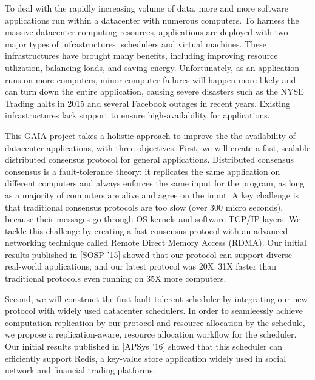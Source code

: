 {}

To deal with the rapidly increasing volume of data, more and more software
applications run within a datacenter with numerous computers. To harness the 
massive datacenter computing resources, applications are deployed with two 
major 
types of infrastructures: schedulers and virtual machines. These 
infrastructures have brought many benefits, including improving resource 
utlization, balancing loads, and saving energy. Unfortunately, as an 
application 
runs on more computers, minor computer failures will happen more likely and can 
turn down the entire application, causing severe disasters such as the NYSE 
Trading halts in 2015 and several Facebook outages in recent years. Existing 
infrastructures lack support to ensure high-availability for applications.

This GAIA project takes a holistic approach to improve the the availability of 
datacenter applications, with three objectives. First, we will create a fast, 
scalable distributed consensus protocol for general applications. Distributed 
consensus consensus is a fault-tolerance theory: it replicates the same 
application on different computers and always enforces the same input for the 
program, as long as a majority of computers are alive and agree on the input. A 
key challenge is that traditional consensus protocols are too slow (over 300 
micro seconds), because their messages go through OS kernels and software 
TCP/IP layers. We tackle this challenge by creating a fast consensus protocol 
with an advanced networking technique called Remote Direct Memory Access 
(RDMA). Our initial results published in [SOSP '15] showed that our protocol 
can support diverse real-world applications, and our latest protocol was 
20X~31X faster than traditional protocols even running on 35X more computers.



Second, we will construct the first fault-tolerent scheduler by integrating our 
new protocol with widely used datacenter schedulers. In order to seamleessly 
achieve computation replication by our protocol and resource allocation by the 
schedule, we propose a replication-aware, resource allocation workflow for the 
scheduler. Our initial results published in [APSys '16] showed that this 
scheduler can efficiently support Redis, a key-value store application widely 
used in social network and financial trading platforms.

